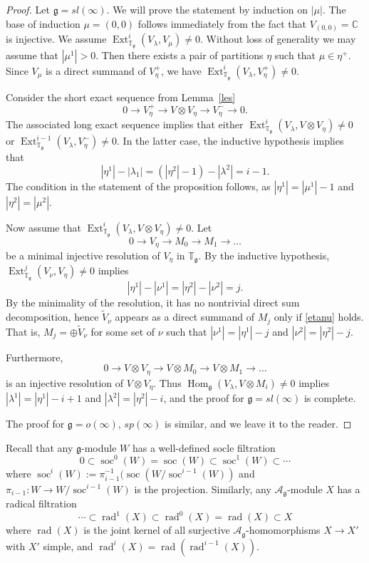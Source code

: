 \documentclass{amsart}
\renewcommand{\sl}{sl}
\newcommand{\so}{o}
\newcommand{\Tg}{\mathbb T_{\mathfrak g}}
\renewcommand{\sp}{sp}
\renewcommand{\gg}{\mathfrak{g}}
\newcommand{\soc}{\operatorname{soc}}
\newcommand{\rad}{\operatorname{rad}}
\theoremstyle{definition}
\numberwithin{equation}{section}
\begin{document}
\begin{proof} Let $\gg=\sl(\infty)$. We will prove the statement by
  induction on $|\mu|$. The base of induction $\mu=(0,0)$
  follows immediately from the fact that
  $V_{(0,0)}=\mathbb C$ is injective. We assume $\operatorname{Ext}^i_{\Tg}(V_\lambda,V_\mu)\neq  0$.  Without loss of generality we
  may assume that $|\mu^1|>0$. Then there exists a pair of partitions $\eta$ such that $\mu \in \eta^+$.
   Since $V_\mu$ is a direct summand of $V^+_\eta$, we have $\operatorname{Ext}^i_{\Tg}(V_\lambda, V^+_\eta)\neq  0$.

Consider the short exact sequence from Lemma~\ref{les}
$$0\to V_\eta^+\to V \otimes V_\eta \to V_\eta^-\to 0.$$
The associated long exact sequence implies that either $\operatorname{Ext}^i_{\Tg}(V_\lambda, V \otimes V_\eta)\neq  0$ or $\operatorname{Ext}^{i-1}_{\Tg}(V_\lambda, V^-_\eta)\neq  0$.  In the latter case, the inductive hypothesis implies that
$$| \eta^1| - | \lambda_1 | = (| \eta^2| -1) - | \lambda^2| = i-1.$$ 
The condition in the statement of the proposition follows, as $| \eta^1| = |\mu^1| -1$ and $ |\eta^2 | = | \mu^2 |$. 

Now assume that $\operatorname{Ext}^i_{\Tg}(V_\lambda, V \otimes V_\eta)\neq  0$.  Let 
$$0\to V_\eta\to M_0\to M_1\to\dots$$
be a minimal injective resolution of $V_\eta$ in $\Tg$.
By the inductive hypothesis, $\operatorname{Ext}^j_{\Tg}(V_\nu,V_\eta)\neq 0$
implies 
\begin{equation} \label{etanu}
|\eta^1|-|\nu^1|=|\eta^2|-|\nu^2|=j.
\end{equation}
By the minimality of the resolution, it has no nontrivial direct sum decomposition, 
hence $\tilde V_\nu$ appears as a direct summand of $M_j$ only
if \eqref{etanu} holds. That is, $M_j=\oplus \tilde V_\nu$ for some set of $\nu$ such that $|\nu^1| = |\eta^1|-j$ and $|\nu^2| = |\eta^2|-j$.   

Furthermore, 
$$0\to V \otimes V_\eta\to V \otimes M_0\to V \otimes M_1\to\dots$$
is an injective resolution of  $V \otimes V_\eta$.  Thus $\operatorname{Hom}_\gg ( V_\lambda , V \otimes M_i) \neq 0$ implies $|\lambda^1| = |\eta^1| - i + 1$ and $|\lambda^2| = |\eta^2| - i$, and the proof for $\gg = \sl(\infty)$ is complete.

The proof for $\gg=\so(\infty)$, $\sp(\infty)$ is similar, and
we leave it to the reader.
\end{proof}

Recall that any $\gg$-module $W$ has a well-defined socle filtration $$0 \subset \soc^0 (W) = \soc (W) \subset \soc^1 (W) \subset \cdots$$
where $\soc^i(W) := \pi^{-1}_{i-1} (\soc (W / \soc^{i-1}(W))$ and $\pi_{i-1} : W \rightarrow W/\soc^{i-1}(W)$ is the projection.  Similarly, any $\mathcal A_\gg$-module $X$ has a radical filtration
$$ \cdots \subset \rad^1(X) \subset \rad^0(X) = \rad (X) \subset X$$
where $\rad(X)$ is the joint kernel of all surjective $\mathcal A_\gg$-homomorphisms $X \rightarrow X'$ with $X'$ simple, and $\rad^i(X) = \rad (\rad^{i-1}(X))$.
\end{document}
